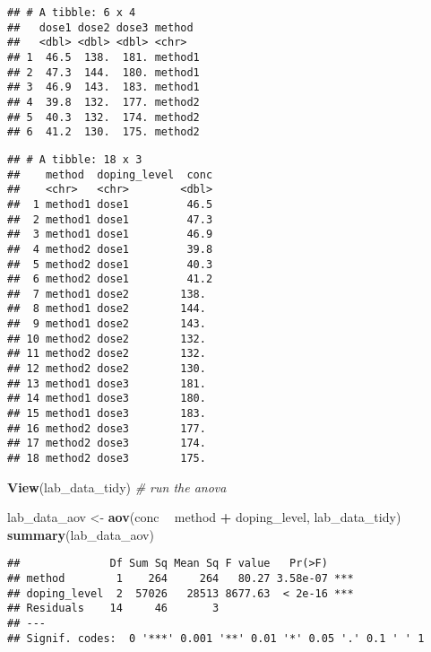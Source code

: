 \documentclass[]{book}
\newenvironment{Shaded}{\begin{snugshade}}{\end{snugshade}}
\newcommand{\CommentTok}[1]{\textcolor[rgb]{0.56,0.35,0.01}{\textit{#1}}}
\newcommand{\DataTypeTok}[1]{\textcolor[rgb]{0.13,0.29,0.53}{#1}}
\newcommand{\KeywordTok}[1]{\textcolor[rgb]{0.13,0.29,0.53}{\textbf{#1}}}
\newcommand{\NormalTok}[1]{#1}
\newcommand{\OperatorTok}[1]{\textcolor[rgb]{0.81,0.36,0.00}{\textbf{#1}}}
\newcommand{\StringTok}[1]{\textcolor[rgb]{0.31,0.60,0.02}{#1}}
\theoremstyle{definition}
\theoremstyle{definition}
\theoremstyle{definition}
\theoremstyle{remark}
\begin{document}
\begin{verbatim}
## # A tibble: 6 x 4
##   dose1 dose2 dose3 method 
##   <dbl> <dbl> <dbl> <chr>  
## 1  46.5  138.  181. method1
## 2  47.3  144.  180. method1
## 3  46.9  143.  183. method1
## 4  39.8  132.  177. method2
## 5  40.3  132.  174. method2
## 6  41.2  130.  175. method2
\end{verbatim}

\begin{Shaded}
\end{Shaded}

\begin{verbatim}
## # A tibble: 18 x 3
##    method  doping_level  conc
##    <chr>   <chr>        <dbl>
##  1 method1 dose1         46.5
##  2 method1 dose1         47.3
##  3 method1 dose1         46.9
##  4 method2 dose1         39.8
##  5 method2 dose1         40.3
##  6 method2 dose1         41.2
##  7 method1 dose2        138. 
##  8 method1 dose2        144. 
##  9 method1 dose2        143. 
## 10 method2 dose2        132. 
## 11 method2 dose2        132. 
## 12 method2 dose2        130. 
## 13 method1 dose3        181. 
## 14 method1 dose3        180. 
## 15 method1 dose3        183. 
## 16 method2 dose3        177. 
## 17 method2 dose3        174. 
## 18 method2 dose3        175.
\end{verbatim}

\begin{Shaded}
\begin{Highlighting}[]
\KeywordTok{View}\NormalTok{(lab_data_tidy)}
\CommentTok{# run the anova}

\NormalTok{lab_data_aov <-}\StringTok{ }\KeywordTok{aov}\NormalTok{(conc }\OperatorTok{~}\StringTok{ }\NormalTok{method }\OperatorTok{+}\StringTok{ }\NormalTok{doping_level, lab_data_tidy)}
\KeywordTok{summary}\NormalTok{(lab_data_aov)}
\end{Highlighting}
\end{Shaded}

\begin{verbatim}
##              Df Sum Sq Mean Sq F value   Pr(>F)    
## method        1    264     264   80.27 3.58e-07 ***
## doping_level  2  57026   28513 8677.63  < 2e-16 ***
## Residuals    14     46       3                     
## ---
## Signif. codes:  0 '***' 0.001 '**' 0.01 '*' 0.05 '.' 0.1 ' ' 1
\end{verbatim}
\end{document}
